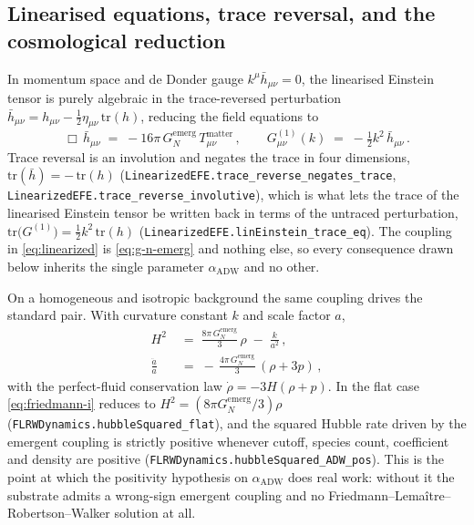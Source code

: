 \documentclass[aps,prd,nofootinbib,superscriptaddress,12pt]{revtex4-2}
\DeclareRobustCommand{\lb}{\discretionary{}{}{}}
\begin{document}
\subsection{Linearised equations, trace reversal, and the cosmological reduction}
\label{sec:efe-linear}

In momentum space and de Donder gauge $k^{\mu}\bar{h}_{\mu\nu} = 0$, the
linearised Einstein tensor is purely algebraic in the trace-reversed
perturbation $\bar{h}_{\mu\nu} = h_{\mu\nu} - \tfrac12
\eta_{\mu\nu}\,\mathrm{tr}(h)$, reducing the field equations to
\begin{equation}
\label{eq:linearized}
\Box\,\bar{h}_{\mu\nu} \;=\; -16\pi\,G_N^{\mathrm{emerg}}\,
  T^{\mathrm{matter}}_{\mu\nu}\,,
\qquad
G^{(1)}_{\mu\nu}(k) \;=\; -\tfrac12 k^{2}\,\bar{h}_{\mu\nu}\,.
\end{equation}
Trace reversal is an involution and negates the trace in four dimensions,
$\mathrm{tr}(\bar{h}) = -\,\mathrm{tr}(h)$
(\texttt{Linearized\lb{}EFE.\lb{}trace\_\lb{}reverse\_\lb{}negates\_\lb{}trace},
\texttt{Linearized\lb{}EFE.\lb{}trace\_\lb{}reverse\_\lb{}involutive}), which is what lets the trace
of the linearised Einstein tensor be written back in terms of the untraced
perturbation, $\mathrm{tr}\bigl(G^{(1)}\bigr) = \tfrac12 k^{2}\,\mathrm{tr}(h)$
(\texttt{Linearized\lb{}EFE.\lb{}lin\lb{}Einstein\_\lb{}trace\_\lb{}eq}). The coupling in
\eqref{eq:linearized} is \eqref{eq:g-n-emerg} and nothing else, so every
consequence drawn below inherits the single parameter
$\alpha_{\mathrm{ADW}}$ and no other.

On a homogeneous and isotropic background the same coupling drives the standard
pair. With curvature constant $k$ and scale factor $a$,
\begin{align}
\label{eq:friedmann-i}
H^{2} &\;=\; \frac{8\pi\,G_N^{\mathrm{emerg}}}{3}\,\rho \;-\; \frac{k}{a^{2}}\,,\\
\label{eq:friedmann-ii}
\frac{\ddot a}{a} &\;=\; -\,\frac{4\pi\,G_N^{\mathrm{emerg}}}{3}\,(\rho + 3p)\,,
\end{align}
with the perfect-fluid conservation law $\dot\rho = -3H(\rho + p)$. In the flat
case \eqref{eq:friedmann-i} reduces to $H^{2} = (8\pi
G_N^{\mathrm{emerg}}/3)\rho$ (\texttt{FLRWDynamics.\lb{}hubble\lb{}Squared\_\lb{}flat}), and the
squared Hubble rate driven by the emergent coupling is strictly positive
whenever cutoff, species count, coefficient and density are positive
(\texttt{FLRWDynamics.\lb{}hubble\lb{}Squared\_\lb{}ADW\_\lb{}pos}). This is the point at which the
positivity hypothesis on $\alpha_{\mathrm{ADW}}$ does real work: without it the
substrate admits a wrong-sign emergent coupling and no
Friedmann--Lema\^{i}tre--Robertson--Walker solution at all.
\end{document}

